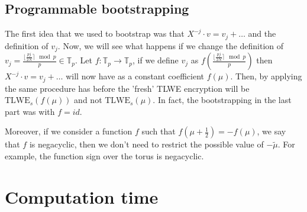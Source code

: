 \documentclass{article}
\newcommand{\T}{\mathbb{T}}
\newcommand{\round}[1]{\lfloor#1\rceil}
\theoremstyle{definition}
\theoremstyle{Theorem}
\begin{document}
\subsection{Programmable bootstrapping}
The first idea that we used to bootstrap was that $X^{-j}\cdot v = v_j +\ldots$ and the definition of $v_j$. Now, we will see what happens if we change the definition of $v_j = \frac{\round{\frac{pj}{2N}}\mod p}{p} \in \T_p$. Let $f:\T_p\longrightarrow\T_p$, if we define $v_j$ as $f(\frac{\round{\frac{pj}{2N}}\mod p}{p})$ then $X^{-j}\cdot v = v_j +\ldots$ will now have as a constant coefficient $f(\mu)$. Then, by applying the same procedure has before the 'fresh' TLWE encryption will be $\text{TLWE}_s(f(\mu))$ and not $\text{TLWE}_s(\mu)$. In fact, the bootstrapping in the last part was with $f=id$. 

Moreover, if we consider a function $f$ such that $f(\mu+\frac{1}{2})= -f(\mu)$, we say that $f$ is negacyclic, then we don't need to restrict the possible value of $-\tilde{\mu}$. For example, the function sign over the torus is negacyclic. 

\section{Computation time}
\end{document}
